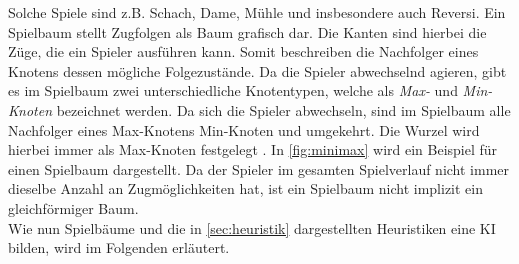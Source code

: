 \documentclass[12pt,a4paper,bibliography=totocnumbered,listof=totocnumbered]{article}
\begin{document}
Solche Spiele sind z.B. Schach, Dame, Mühle und insbesondere auch Reversi. Ein Spielbaum stellt Zugfolgen als Baum grafisch dar. Die Kanten sind hierbei die Züge, die ein Spieler ausführen kann. Somit beschreiben die Nachfolger eines Knotens dessen mögliche Folgezustände. Da die Spieler abwechselnd agieren, gibt es im Spielbaum zwei unterschiedliche Knotentypen, welche als \emph{Max-} und \emph{Min-Knoten} bezeichnet werden. Da sich die Spieler abwechseln, sind im Spielbaum alle Nachfolger eines Max-Knotens Min-Knoten und umgekehrt. Die Wurzel wird hierbei immer als Max-Knoten festgelegt \citep[S. 10 ff.]{Reinefeld.1989}. In \autoref{fig:minimax} wird ein Beispiel für einen Spielbaum dargestellt. Da der Spieler im gesamten Spielverlauf nicht immer dieselbe Anzahl an Zugmöglichkeiten hat, ist ein Spielbaum nicht implizit ein gleichförmiger Baum.\\
Wie nun Spielbäume und die in \autoref{sec:heuristik} dargestellten Heuristiken eine KI bilden, wird im Folgenden erläutert.

\end{document}
